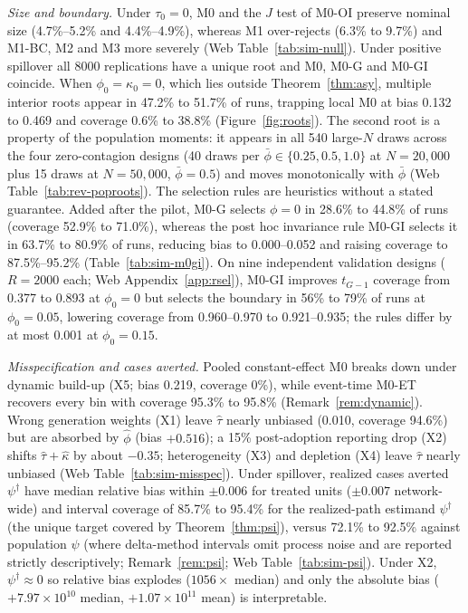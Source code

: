 \emph{Size and boundary.} Under $\tau_0=0$, M0 and the $J$ test of M0-OI preserve nominal size
(4.7\%--5.2\% and 4.4\%--4.9\%), whereas M1 over-rejects (6.3\% to 9.7\%) and M1-BC, M2 and M3 more
severely (Web Table~\ref{tab:sim-null}). Under positive spillover all 8000 replications have a unique
root and M0, M0-G and M0-GI coincide. When $\phi_0=\kappa_0=0$, which lies outside
Theorem~\ref{thm:asy}, multiple interior roots appear in 47.2\% to 51.7\% of runs, trapping local M0
at bias 0.132 to 0.469 and coverage 0.6\% to 38.8\% (Figure~\ref{fig:roots}). The second root is a
property of the population moments: it appears in all 540 large-$N$ draws across the four
zero-contagion designs (40 draws per $\bar\phi\in\{0.25,0.5,1.0\}$ at $N=20{,}000$ plus 15 draws
at $N=50{,}000$, $\bar\phi=0.5$) and moves monotonically with $\bar\phi$ (Web
Table~\ref{tab:rev-poproots}). The selection rules are heuristics without a stated guarantee. Added
after the pilot, M0-G selects $\phi=0$ in 28.6\% to 44.8\% of runs (coverage 52.9\% to 71.0\%),
whereas the post hoc invariance rule M0-GI selects it in 63.7\% to 80.9\% of runs, reducing bias to
0.000--0.052 and raising coverage to 87.5\%--95.2\% (Table~\ref{tab:sim-m0gi}). On nine independent
validation designs ($R=2000$ each; Web Appendix~\ref{app:rsel}), M0-GI improves $t_{G-1}$ coverage
from 0.377 to 0.893 at $\phi_0=0$ but selects the boundary in 56\% to 79\% of runs at
$\phi_0=0.05$, lowering coverage from 0.960--0.970 to 0.921--0.935; the rules differ by at most
0.001 at $\phi_0=0.15$.

\emph{Misspecification and cases averted.} Pooled constant-effect M0 breaks down under dynamic
build-up (X5; bias 0.219, coverage 0\%), while event-time M0-ET recovers every bin with coverage
95.3\% to 95.8\% (Remark~\ref{rem:dynamic}). Wrong generation weights (X1) leave $\hat\tau$ nearly
unbiased (0.010, coverage 94.6\%) but are absorbed by $\hat\phi$ (bias $+0.516$); a 15\% post-adoption
reporting drop (X2) shifts $\hat\tau+\hat\kappa$ by about $-0.35$; heterogeneity (X3) and depletion
(X4) leave $\hat\tau$ nearly unbiased (Web Table~\ref{tab:sim-misspec}). Under spillover, realized
cases averted $\psi^\dagger$ have median relative bias within $\pm0.006$ for treated units
($\pm0.007$ network-wide) and interval coverage of
85.7\% to 95.4\% for the realized-path estimand $\psi^\dagger$ (the unique target covered by Theorem~\ref{thm:psi}), versus 72.1\% to 92.5\% against population $\psi$ (where delta-method intervals omit process noise and are reported strictly descriptively; Remark~\ref{rem:psi}; Web Table~\ref{tab:sim-psi}). Under X2, $\psi^\dagger\approx 0$ so relative bias explodes ($1056\times$ median) and only the absolute bias ($+7.97\times 10^{10}$ median, $+1.07\times 10^{11}$ mean) is interpretable.

